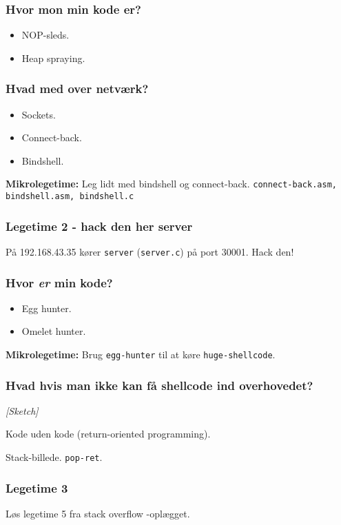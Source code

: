 \documentclass[slidestop,compress,mathserif, xcolor=table]{beamer}
\begin{document}
\begin{frame}[c]
    \frametitle{Hvor mon min kode er?}

    \begin{itemize}
    \item NOP-sleds.
    \item Heap spraying.
    \end{itemize}
\end{frame}

\begin{frame}[c]
    \frametitle{Hvad med over netværk?}

    \begin{itemize}
    \item Sockets.
    \item Connect-back.
    \item Bindshell.
    \end{itemize}

    \pause
    \vskip10pt

    \textbf{Mikrolegetime:} Leg lidt med bindshell og connect-back.
    \texttt{connect-back.asm, bindshell.asm, bindshell.c}

\end{frame}

\begin{frame}[c]
    \frametitle{Legetime 2 - hack den her server}

    På 192.168.43.35 kører \texttt{server} (\texttt{server.c}) på port
    30001. Hack den!

\end{frame}

\begin{frame}[c]
    \frametitle{Hvor \emph{er} min kode?}

    \begin{itemize}
    \item Egg hunter.
    \item Omelet hunter.
    \end{itemize}

    

    \pause
    \textbf{Mikrolegetime:} Brug \texttt{egg-hunter} til at køre
    \texttt{huge-shellcode}.
\end{frame}

\begin{frame}[c]
  \frametitle{Hvad hvis man ikke kan få shellcode ind overhovedet?}

  \textit{[Sketch]}
  \vskip20pt

  Kode uden kode (return-oriented programming).


  Stack-billede. \texttt{pop-ret}.

\end{frame}

\begin{frame}[c]
    \frametitle{Legetime 3}

    Løs legetime 5 fra stack overflow -oplægget.

\end{frame}
\end{document}
